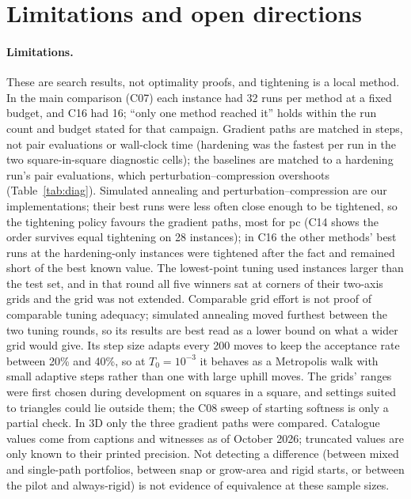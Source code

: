 \section{Limitations and open directions}\label{sec:limits}
\paragraph{Limitations.} These are search results, not optimality proofs, and tightening is a local method. In the main comparison (C07) each instance had 32 runs per method at a fixed budget, and C16 had 16; ``only one method reached it'' holds within the run count and budget stated for that campaign. Gradient paths are matched in steps, not pair evaluations or wall-clock time (hardening was the fastest per run in the two square-in-square diagnostic cells); the baselines are matched to a hardening run's pair evaluations, which perturbation--compression overshoots (Table~\ref{tab:diag}). Simulated annealing and perturbation--compression are our implementations; their best runs were less often close enough to be tightened, so the tightening policy favours the gradient paths, most for pc (C14 shows the order survives equal tightening on 28 instances); in C16 the other methods' best runs at the hardening-only instances were tightened after the fact and remained short of the best known value. The lowest-point tuning used instances larger than the test set, and in that round all five winners sat at corners of their two-axis grids and the grid was not extended. Comparable grid effort is not proof of comparable tuning adequacy; simulated annealing moved furthest between the two tuning rounds, so its results are best read as a lower bound on what a wider grid would give. Its step size adapts every 200 moves to keep the acceptance rate between 20\% and 40\%, so at $T_0=10^{-3}$ it behaves as a Metropolis walk with small adaptive steps rather than one with large uphill moves. The grids' ranges were first chosen during development on squares in a square, and settings suited to triangles could lie outside them; the C08 sweep of starting softness is only a partial check. In 3D only the three gradient paths were compared. Catalogue values come from captions and witnesses as of October 2026; truncated values are only known to their printed precision. Not detecting a difference (between mixed and single-path portfolios, between snap or grow-area and rigid starts, or between the pilot and always-rigid) is not evidence of equivalence at these sample sizes.

